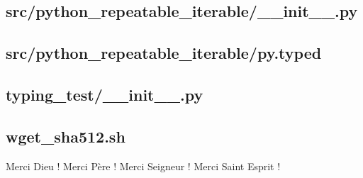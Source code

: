 \documentclass{article}
\begin{document}


\subsection{
  src/python\_repeatable\_iterable/\_\_init\_\_.py
}
\label{
  src:python_repeatable_iterable:__init__py
}



\subsection{
  src/python\_repeatable\_iterable/py.typed
}
\label{
  src:python_repeatable_iterable:pytyped
}



\subsection{
  typing\_test/\_\_init\_\_.py
}
\label{
  typing_test:__init__py
}



\subsection{
  wget\_sha512.sh
}
\label{
  wget_sha512sh
}



Merci Dieu ! Merci P\`ere ! Merci Seigneur ! Merci Saint Esprit !
\end{document}

